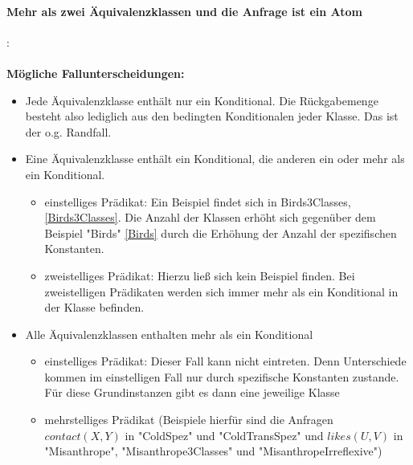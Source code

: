 \documentclass[a4paper, 11pt]{book}
\begin{document}
\paragraph{ Mehr als zwei Äquivalenzklassen und die Anfrage ist ein Atom}: \label{Atom_mehrKlassen}\\
\\
\textbf{Mögliche Fallunterscheidungen:}
\begin{itemize}
	\item Jede Äquivalenzklasse enthält nur ein Konditional. Die Rückgabemenge besteht also lediglich aus den bedingten Konditionalen jeder Klasse. Das ist der o.g. Randfall.
	\item Eine Äquivalenzklasse enthält ein Konditional, die anderen ein oder mehr als ein Konditional. 
	\begin{itemize}
		\item einstelliges Prädikat: Ein Beispiel findet sich in Birds3Classes, \ref{Birds3Classes}. Die Anzahl der Klassen erhöht sich gegenüber dem Beispiel "{}Birds"{} \ref{Birds} durch die Erhöhung der Anzahl der spezifischen Konstanten.\\
		\item zweistelliges Prädikat: Hierzu ließ sich kein Beispiel finden. Bei zweistelligen Prädikaten werden sich immer mehr als ein Konditional in der Klasse befinden.
	\end{itemize}
	\item Alle Äquivalenzklassen enthalten mehr als ein Konditional
	\begin{itemize}
		\item einstelliges Prädikat: Dieser Fall kann nicht eintreten. Denn Unterschiede kommen im einstelligen Fall nur durch spezifische Konstanten zustande. Für diese Grundinstanzen gibt es dann eine jeweilige Klasse\\
		\item mehrstelliges Prädikat (Beispiele hierfür sind die Anfragen $ contact(X,Y) $ in "{}ColdSpez"{} und "{}ColdTransSpez"{} und $ likes(U,V) $ in "{}Misanthrope"{}, "{}Misanthrope3Classes"{} und "{}MisanthropeIrreflexive"{}) \\
	\end{itemize}
\end{itemize}
\end{document}
